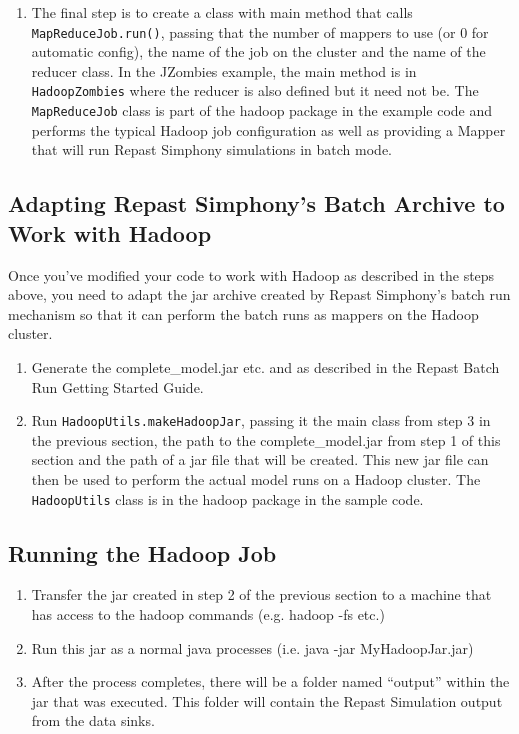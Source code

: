 \documentclass[11pt]{amsart}
\begin{document}
\begin{enumerate}
\item
The final step is to create a class with main method that calls \texttt{MapReduceJob.run()}, passing that the number of mappers to use (or 0 for automatic config), the name of the job on the cluster and the name of the reducer class. In the JZombies example, the main method is in \texttt{HadoopZombies} where the reducer is also defined but it need not be. The \texttt{MapReduceJob} class is part of the hadoop package in the example code and performs the typical Hadoop job configuration as well as providing a Mapper that will run Repast Simphony simulations in batch mode.
\end{enumerate}


\subsection{Adapting Repast Simphony's Batch Archive to Work with Hadoop}
Once you've modified your code to work with Hadoop as described in the steps above, you need to adapt the jar archive created by Repast Simphony's batch run mechanism so that it can perform the batch runs as mappers on the Hadoop cluster.

\begin{enumerate}
\item
Generate the complete\_model.jar etc. and as described in the Repast Batch Run Getting Started Guide.
\item
Run \texttt{HadoopUtils.makeHadoopJar}, passing it the main class from step 3 in the previous section, the path to the complete\_model.jar from step 1 of this section and the path of a jar file that will be created. This new jar file can then be used to perform the actual model runs on a Hadoop cluster. The \texttt{HadoopUtils} class is in the hadoop package in the sample code.
\end{enumerate}

\subsection{Running the Hadoop Job}
\begin{enumerate}
\item Transfer the jar created in step 2 of the previous section to a machine that has access to the hadoop commands (e.g. hadoop -fs etc.)
\item Run this jar as a normal java processes (i.e. java -jar MyHadoopJar.jar)
\item After the process completes, there will be a folder named ``output'' within the jar that was executed. This folder will contain the Repast Simulation output from the data sinks.
\end {enumerate}
\end{document}
